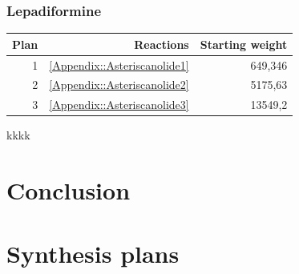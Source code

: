 \documentclass[a4paper,10pt,titlepage]{paper}
\begin{document}
\subsubsection{Lepadiformine}
\begin{table}[H]
\centering
\begin{tabular}{|r|r|r|}
\hline
Plan & Reactions & Starting weight \\ \hline
1 & \ref{Appendix::Asteriscanolide1} & 649,346 \\\hline
2 & \ref{Appendix::Asteriscanolide2} & 5175,63 \\\hline
3 & \ref{Appendix::Asteriscanolide3} & 13549,2 \\\hline
\end{tabular}
\end{table}

kkkk \cite{SynthesisPlans}\\

\section{Conclusion}

\newpage

\printbibliography[type=book, title={Books}]
\printbibliography[type=article, title={Articles}]
\printbibliography[nottype=book, nottype=article, title={Other}]

\newpage
\appendix
\section{Synthesis plans}
\end{document}
